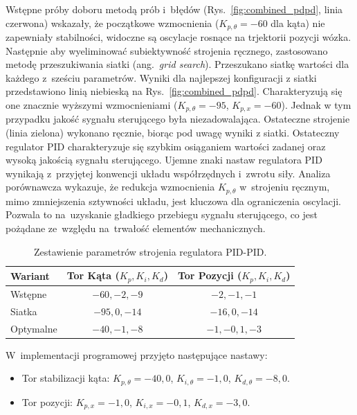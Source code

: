 Wstępne próby doboru metodą prób i~błędów (Rys.~\ref{fig:combined_pdpd}, linia czerwona) 
wskazały, że początkowe wzmocnienia ($K_{p,\theta}=-60$ dla kąta) nie zapewniały stabilności,
widoczne są oscylacje rosnące na trjektorii pozycji wózka.
Następnie aby wyeliminować subiektywność strojenia ręcznego, zastosowano metodę 
przeszukiwania siatki (ang.~\textit{grid search}).
Przeszukano siatkę wartości dla każdego z~sześciu parametrów.
Wyniki dla najlepszej konfiguracji z siatki przedstawiono linią niebieską na Rys.~\ref{fig:combined_pdpd}.
Charakteryzują się one znacznie wyższymi wzmocnieniami ($K_{p,\theta}=-95$, $K_{p,x}=-60$).
Jednak w tym przypadku jakość sygnału sterującego była niezadowalająca.
Ostateczne strojenie (linia zielona) wykonano ręcznie, biorąc pod uwagę wyniki z siatki.
Ostateczny regulator PID charakteryzuje się szybkim osiąganiem wartości zadanej oraz wysoką jakością sygnału sterującego. 
Ujemne znaki nastaw regulatora PID wynikają z~przyjętej konwencji układu współrzędnych i~zwrotu siły.
Analiza porównawcza wykazuje, że redukcja wzmocnienia $K_{p,\theta}$ w~strojeniu ręcznym, mimo zmniejszenia sztywności układu, jest kluczowa dla ograniczenia oscylacji.
Pozwala to na~uzyskanie gładkiego przebiegu sygnału sterującego, co jest pożądane ze~względu na~trwałość elementów mechanicznych.

\begin{table}[H]
    \centering
    \caption{Zestawienie parametrów strojenia regulatora PID-PID.}
    \label{tab:params_pid}
    \begin{tabular}{|l|c|c|}
        \hline
        \textbf{Wariant} & \textbf{Tor Kąta ($K_p, K_i, K_d$)} & \textbf{Tor Pozycji ($K_p, K_i, K_d$)} \\
        \hline
        Wstępne & $-60, -2, -9$ & $-2, -1, -1$ \\ \hline
        Siatka & $-95, 0, -14$ & $-16, 0, -14$ \\ \hline
        Optymalne & $-40, -1, -8$ & $-1, -0{,}1, -3$ \\ \hline
    \end{tabular}
\end{table}

W~implementacji programowej przyjęto następujące nastawy:
\begin{itemize}
    \item Tor stabilizacji kąta: $K_{p,\theta} = -40,0$, $K_{i,\theta} = -1,0$, $K_{d,\theta} = -8,0$.
    \item Tor pozycji: $K_{p,x} = -1,0$, $K_{i,x} = -0,1$, $K_{d,x} = -3,0$.
\end{itemize}

